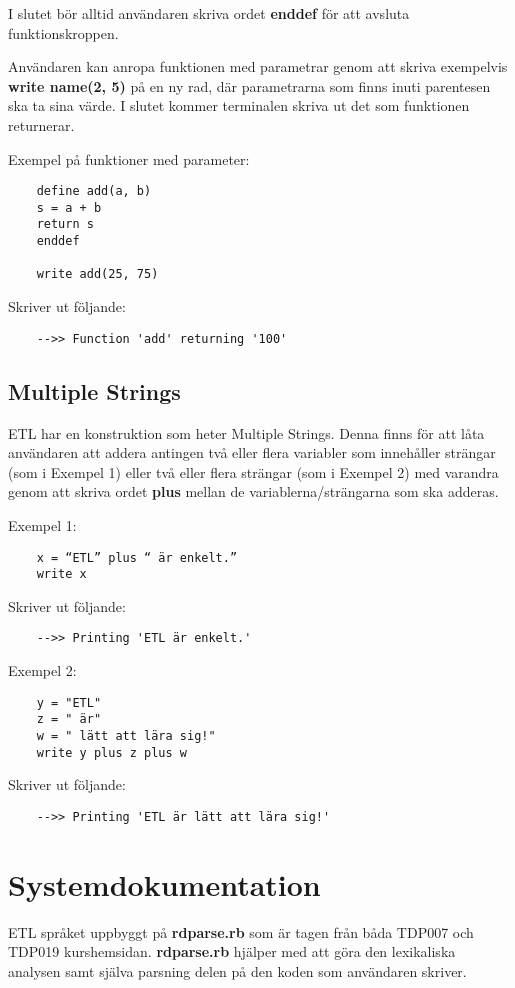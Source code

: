 \documentclass{TDP019mall}
\begin{document}
\begin{enumerate}
I slutet bör alltid användaren skriva ordet \textbf{enddef} för att avsluta funktionskroppen. 
 
Användaren kan anropa funktionen med parametrar genom att skriva exempelvis \textbf{write name(2, 5)} på en ny rad, där parametrarna 
som finns inuti parentesen ska ta sina värde. I slutet kommer terminalen skriva ut det som funktionen returnerar.  
 
 
Exempel på funktioner med parameter:
\begin{verbatim}
    define add(a, b)
    s = a + b
    return s
    enddef

    write add(25, 75)
\end{verbatim}
Skriver ut följande:
\begin{verbatim}
    -->> Function 'add' returning '100'
\end{verbatim}
\end{enumerate}



\subsection{Multiple Strings}
ETL har en konstruktion som heter Multiple Strings. Denna finns för att låta användaren att addera antingen två eller flera variabler som innehåller strängar 
(som i Exempel 1) eller två eller flera strängar (som i Exempel 2) med varandra genom att skriva ordet \textbf{plus} mellan de variablerna/strängarna som ska adderas.

Exempel 1: 
\begin{verbatim}
    x = “ETL” plus “ är enkelt.”
    write x
\end{verbatim}
Skriver ut följande:
\begin{verbatim}
    -->> Printing 'ETL är enkelt.'
\end{verbatim}

Exempel 2:

\begin{verbatim}
    y = "ETL"
    z = " är"
    w = " lätt att lära sig!"
    write y plus z plus w
\end{verbatim}
 
Skriver ut följande:
\begin{verbatim}
    -->> Printing 'ETL är lätt att lära sig!'
\end{verbatim}


\newpage
\section{Systemdokumentation}
ETL språket uppbyggt på \textbf{rdparse.rb} som är tagen från båda TDP007 och TDP019 kurshemsidan. \textbf{rdparse.rb} hjälper med att göra den lexikaliska 
analysen samt själva parsning delen på den koden som användaren skriver. 
\end{document}
